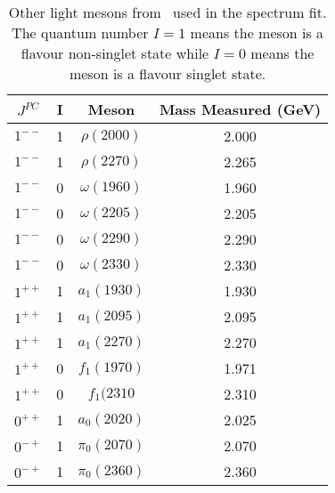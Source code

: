 \documentclass[a4paper,12pt]{article}
\begin{document}
\begin{table}
\centering
\begin{tabular}{ | c | c | c | c | }
\hline
$J^{PC}$ & I & Meson & Mass Measured (GeV) \\
\hline
$1^{--}$ & 1 &  $\rho(2000)$ & 2.000 \\
\hline
$1^{--}$ & 1 & $\rho(2270)$ & 2.265 \\
\hline
$1^{--}$ & 0 &  $\omega(1960)$ & 1.960 \\
\hline
$1^{--}$ & 0 & $\omega(2205)$ & 2.205 \\
\hline
$1^{--}$ & 0 &  $\omega(2290)$ & 2.290 \\
\hline
$1^{--}$ & 0 & $\omega(2330)$ & 2.330 \\
\hline
$1^{++}$ & 1 & $a_1(1930)$ & 1.930\\
\hline
$1^{++}$ & 1 & $a_1(2095)$ & 2.095\\
\hline
$1^{++}$ & 1 & $a_1(2270)$ & 2.270\\
\hline
$1^{++}$ & 0 & $f_1(1970)$ & 1.971\\
\hline
$1^{++}$ & 0 & $f_1(2310$ & 2.310\\
\hline
$0^{++}$ & 1 &  $a_0(2020)$ & 2.025 \\
\hline
$0^{-+}$ & 1 &  $\pi_0(2070)$ & 2.070 \\
\hline
$0^{-+}$ & 1 & $\pi_0(2360)$ & 2.360 \\
\hline
\end{tabular}
\caption{Other light mesons from~\cite{pdg_2020} used in the spectrum fit. The quantum number $I = 1$ means the meson is a flavour non-singlet state while $I = 0$ means the meson is a flavour singlet state.}
\label{table:other light mesons} 
\end{table}
\end{document}
